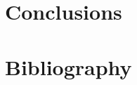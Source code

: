 \documentclass[11pt]{report}
\begin{document}
\chapter{Conclusions}




\chapter{Bibliography}



\appendix
\chapter{}
\end{document}
